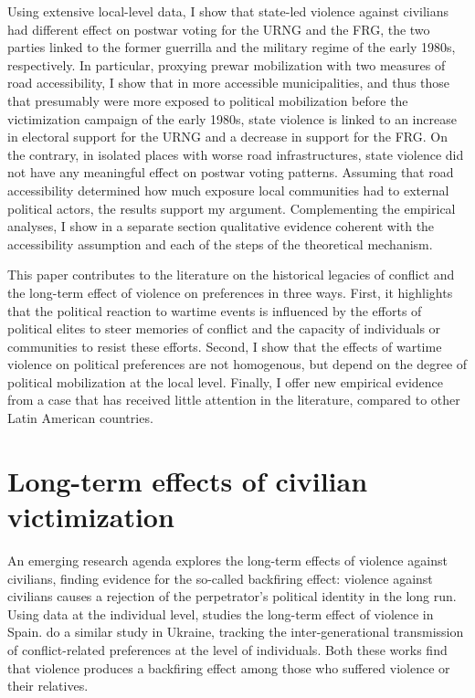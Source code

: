 \documentclass[12pt, notitlepage]{article}
\begin{document}
Using extensive local-level data, I show that state-led violence against civilians had different effect on postwar voting for the URNG and the FRG, the two parties linked to the former guerrilla and the military regime of the early 1980s, respectively.
In particular, proxying prewar mobilization with two measures of road accessibility, I show that in more accessible municipalities, and thus those that presumably were more exposed to political mobilization before the victimization campaign of the early 1980s, state violence is linked to an increase in electoral support for the URNG and a decrease in support for the FRG.
On the contrary, in isolated places with worse road infrastructures, state violence did not have any meaningful effect on postwar voting patterns.
Assuming that road accessibility determined how much exposure local communities had to external political actors, the results support my argument.
Complementing the empirical analyses, I show in a separate section qualitative evidence coherent with the accessibility assumption and each of the steps of the theoretical mechanism.

This paper contributes to the literature on the historical legacies of conflict \citep{Daly:2012aa, Weintraub:2015aa, Osorio:2018aa, Zhukov:2018aa, Osorio:2021aa} and the long-term effect of violence on preferences \citep{Balcells:2012aa, Lupu:2017aa, Fontana:2017aa, Rozenas:2017aa, Rozenas:2019aa} in three ways.
First, it highlights that the political reaction to wartime events is influenced by the efforts of political elites to steer memories of conflict and the capacity of individuals or communities to resist these efforts.
Second, I show that the effects of wartime violence on political preferences are not homogenous, but depend on the degree of political mobilization at the local level.
Finally, I offer new empirical evidence from a case that has received little attention in the literature, compared to other Latin American countries.

\section*{Long-term effects of civilian victimization}

An emerging research agenda explores the long-term effects of violence against civilians, finding evidence for the so-called backfiring effect: violence against civilians causes a rejection of the perpetrator's political identity in the long run.
Using data at the individual level, \citet{Balcells:2012aa} studies the long-term effect of violence in Spain.
\citet{Lupu:2017aa} do a similar study in Ukraine, tracking the inter-generational transmission of conflict-related preferences at the level of individuals.
Both these works find that violence produces a backfiring effect among those who suffered violence or their relatives.
\end{document}
